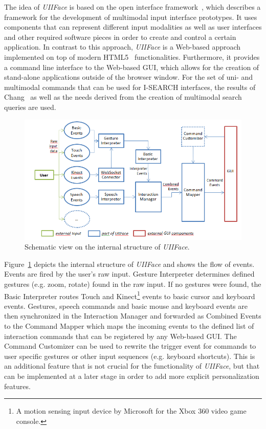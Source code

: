 \documentclass[runningheads,a4paper]{llncs} \usepackage[utf8]{inputenc}
\begin{document}
The idea of \emph{UIIFace} is based on the open interface framework~\cite{openinterface}, which describes a framework for the development of multimodal input interface prototypes. It uses components that can represent different input modalities as well as user interfaces and other required software pieces in order to create and control a certain application. In contrast to this approach, \emph{UIIFace} is a Web-based approach implemented on top of modern HTML5~\cite{html5} functionalities. Furthermore, it provides a command line interface to the Web-based GUI, which allows for the creation of stand-alone applications outside of the browser window. For the set of uni- and multimodal commands that can be used for \mbox{I-SEARCH} interfaces, the results of Chang~\cite{chang} as well as the needs derived from the creation of multimodal search queries are used.

\begin{figure}[h!]
  \centering
    \includegraphics[width=0.8\linewidth]{resources/uiiface-structure.png}
  \caption{Schematic view on the internal structure of \emph{UIIFace}.}
  \label{fig:uiiface}
\end{figure}

Figure~\ref{fig:uiiface} depicts the internal structure of \emph{UIIFace} and shows the flow of events. Events are fired by the user's raw input. Gesture Interpreter determines defined gestures (e.g. zoom, rotate) found in the raw input. If no
gestures were found, the Basic Interpreter routes Touch and Kinect\footnote{A motion sensing input device by Microsoft for the Xbox 360 video game console.} events to basic cursor and keyboard events. Gestures, speech commands and basic mouse and keyboard events are then synchronized in the Interaction Manager and forwarded as Combined Events to the Command Mapper which maps the incoming events to the defined list of interaction commands that can be registered by any Web-based GUI. The Command Customizer can be used to rewrite the trigger event for commands to user specific gestures or other input sequences (e.g. keyboard shortcuts). This is an additional feature that is not crucial for the functionality of \emph{UIIFace}, but that can be implemented at a later stage in order to add more explicit personalization features.
\end{document}
